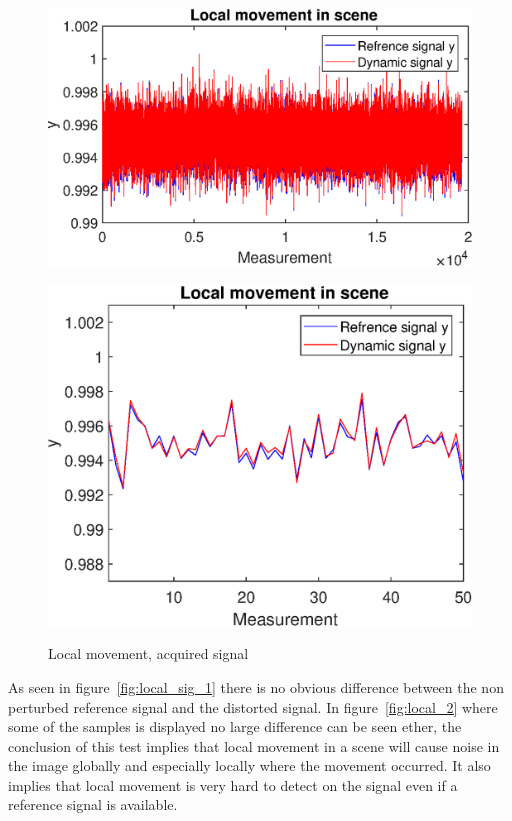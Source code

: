 \begin{figure}[H]
    \centering
\begin{minipage}[t]{0.495\textwidth}
    \includegraphics[width=1\textwidth]{result/dynamic/local/local_whole_time.eps}
    \label{fig:local_sig_1}
\end{minipage}
\begin{minipage}[t]{0.495\textwidth}
    \includegraphics[width = \textwidth]{result/dynamic/local/local_whole_time_win.eps}
    \label{fig:local_sig_2}
\end{minipage}
    \caption{Local movement, acquired signal}
    \label{fig:local_sig}
\end{figure}


As seen in figure~\ref{fig:local_sig_1} there is no obvious difference between the non perturbed reference signal and the distorted signal. In figure~\ref{fig:local_2} where some of the samples is displayed no large difference can be seen ether, the conclusion of this test implies that local movement in a scene will cause noise in the image globally and especially locally where the movement occurred. It also implies that local movement is very hard to detect on the signal even if a reference signal is available.\\[0.1in] 

